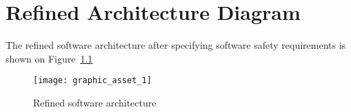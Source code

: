 \chapter{Refined Architecture Diagram}
\label{ch:arch}

The refined software architecture after specifying software safety 
requirements is shown on Figure~\ref{fig:ref-arch-tech}

\begin{figure}[!htbp]
\texttt{[image: graphic\_asset\_1]}
\caption{Refined software architecture}
\label{fig:ref-arch-tech}
\end{figure}

